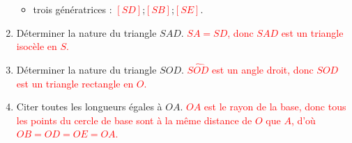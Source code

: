\begin{corrige}
\begin{enumerate}
        \begin{itemize}
            \item trois génératrices : \textcolor{red}{$[SD]$};\textcolor{red}{$[SB]$};\textcolor{red}{$[SE]$}.
        \end{itemize}
        \item Déterminer la nature du triangle $SAD$.
        \textcolor{red}{$SA=SD$, donc $SAD$ est un triangle isocèle en $S$.}
        \item Déterminer la nature du triangle $SOD$.
        \textcolor{red}{$\widehat{SOD}$ est un angle droit, donc $SOD$ est un triangle rectangle en $O$.}
        \item Citer toutes les longueurs égales à $OA$.
        \textcolor{red}{$OA$ est le rayon de la base, donc tous les points du cercle de base sont à la même distance de $O$ que $A$, d'où $OB=OD=OE=OA$.}
    \end{enumerate}
\end{corrige}


